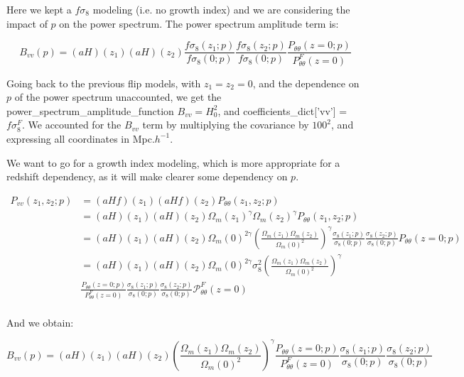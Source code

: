 \documentclass{article}
\begin{document}
Here we kept a $f\sigma_8$ modeling (i.e. no growth index) and we are considering the impact of $p$ on the power spectrum. The power spectrum amplitude term is:

\begin{equation}
    B_{vv}(p) = (aH)(z_1) (aH)(z_2)  \frac{f\sigma_8(z_1; p)}{f\sigma_{8}(0; p)} \frac{f\sigma_8(z_2; p)}{f\sigma_{8}(0; p)} \frac{P_{\theta\theta}(z=0;p)}{P^{F}_{\theta\theta}(z=0)}
\end{equation}

Going back to the previous flip models, with $z_1 = z_2 = 0$, and the dependence on $p$ of the power spectrum unaccounted, we get the power\_spectrum\_amplitude\_function $B_{vv} = H_0^2$, and coefficients\_dict['vv'] = $f \sigma_8^F$. We accounted for the $B_{vv}$ term by multiplying the covariance by $100^2$, and expressing all coordinates in Mpc.$h^{-1}$. 


We want to go for a growth index modeling, which is more appropriate for a redshift dependency, as it will make clearer some dependency on $p$. 

\begin{align}
    P_{vv}(z_1,z_2;p)
    &= (aHf)(z_1)(aHf)(z_2) P_{\theta\theta}(z_1, z_2;p) \\ 
    &= (aH)(z_1)(aH)(z_2) \Omega_{m}(z_1)^\gamma \Omega_{m}(z_2)^\gamma P_{\theta\theta}(z_1, z_2;p) \\  
    &= (aH)(z_1)(aH)(z_2) \Omega_{m}(0)^{2\gamma} \left(\frac{\Omega_{m}(z_1) \Omega_{m}(z_2)}{\Omega_{m}(0)^{2}}\right)^\gamma \frac{\sigma_8(z_1; p)}{\sigma_{8}(0; p)} \frac{\sigma_8(z_2; p)}{\sigma_{8}(0; p)} P_{\theta\theta}(z=0;p) \\  
 & = (aH)(z_1)(aH)(z_2) \Omega_{m}(0)^{2\gamma} \sigma_8^2 \left(\frac{\Omega_{m}(z_1) \Omega_{m}(z_2)}{\Omega_{m}(0)^{2}}\right)^\gamma   \\ 
 &  \frac{P_{\theta\theta}(z=0;p)}{P^{F}_{\theta\theta}(z=0)} \frac{\sigma_8(z_1; p)}{\sigma_{8}(0; p)} \frac{\sigma_8(z_2; p)}{\sigma_{8}(0; p)} \mathcal{P}^{F}_{\theta\theta}(z=0) \\ 
\end{align}

And we obtain:

\begin{equation}
    B_{vv}(p) = (aH)(z_1)(aH)(z_2)\left(\frac{\Omega_{m}(z_1) \Omega_{m}(z_2)}{\Omega_{m}(0)^{2}}\right)^\gamma  \frac{P_{\theta\theta}(z=0;p)}{P^{F}_{\theta\theta}(z=0)} \frac{\sigma_8(z_1; p)}{\sigma_{8}(0; p)} \frac{\sigma_8(z_2; p)}{\sigma_{8}(0; p)} 
\end{equation}
\end{document}
